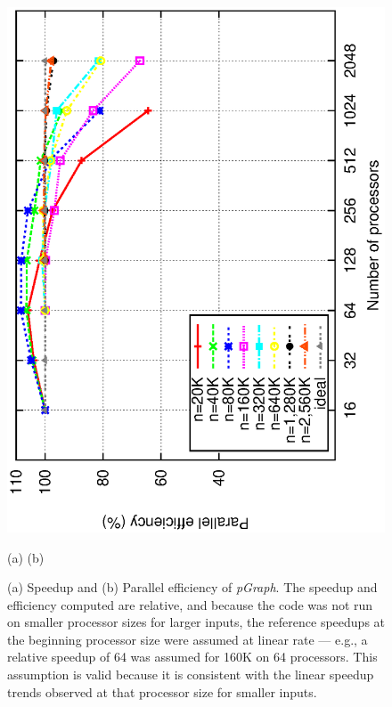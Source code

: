 \documentclass[10pt,journal,letterpaper,compsoc]{IEEEtran}
\begin{document}
\begin{figure}[t]
{            \includegraphics[angle=-90, scale=0.5]{efficiency.eps}
}
\centerline{(a) \hspace*{2.6in}(b)}
\caption{
(a) Speedup and (b) Parallel efficiency of {\it pGraph}. 
The speedup and efficiency computed are relative, and because the code was not run on smaller processor sizes for larger inputs, the reference speedups at the beginning processor size were assumed at linear rate --- e.g., a relative speedup of 64 was assumed for 160K on 64 processors. This assumption is valid because it is consistent with the linear speedup trends observed at that processor size for smaller inputs.
}
\label{figSpeedup}
\end{figure}
\end{document}
